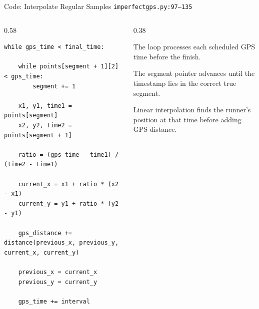 \documentclass[aspectratio=169,11pt]{beamer}
\begin{document}
\begin{frame}[fragile]{Code: Interpolate Regular Samples}
\scriptsize
{} \texttt{imperfectgps.py:97--135}

\vspace{0.08cm}
\begin{columns}[T,totalwidth=\textwidth]
\begin{column}{0.58\textwidth}
\begin{lstlisting}[style=cpcode]
while gps_time < final_time:

    while points[segment + 1][2] < gps_time:
        segment += 1

    x1, y1, time1 = points[segment]
    x2, y2, time2 = points[segment + 1]

    ratio = (gps_time - time1) / (time2 - time1)

    current_x = x1 + ratio * (x2 - x1)
    current_y = y1 + ratio * (y2 - y1)

    gps_distance += distance(previous_x, previous_y, current_x, current_y)

    previous_x = current_x
    previous_y = current_y

    gps_time += interval
\end{lstlisting}
\end{column}
\begin{column}{0.38\textwidth}
\begin{tightitemize}
  \item The loop processes each scheduled GPS time before the finish.
  \item The segment pointer advances until the timestamp lies in the correct true segment.
  \item Linear interpolation finds the runner's position at that time before adding GPS distance.
\end{tightitemize}
\end{column}
\end{columns}
\end{frame}
\end{document}
